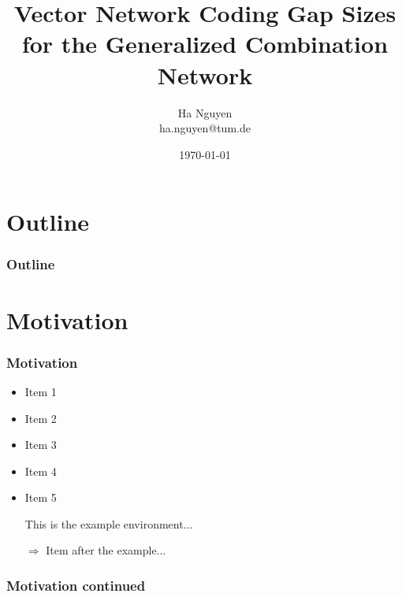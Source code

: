 \documentclass[c]{beamer}
\title[Vector Network Coding Gap Sizes for the Generalized Combination Network]{Vector Network Coding Gap Sizes for the Generalized Combination Network}
\author[Ha Nguyen]{Ha Nguyen\\ {\footnotesize \hspace{1mm} ha.nguyen@tum.de} }
\date{\today}
\begin{document}
\begin{frame}
	\titlepage
\end{frame}

\section*{Outline}
\begin{frame}
	\frametitle{Outline}
	\tableofcontents
\end{frame}


\section{Motivation}
\begin{frame}[c]
\frametitle{Motivation}

	\begin{itemize}%
		\item Item 1
		\item Item 2
		\item Item 3
		\item Item 4
		\item Item 5

	\begin{example}
		This is the example environment...
	\end{example}

		\item[$\Longrightarrow$] Item after the example...
	\end{itemize}
\end{frame}


\begin{frame}[c]
\frametitle{Motivation continued}

	
\end{frame}
\end{document}
